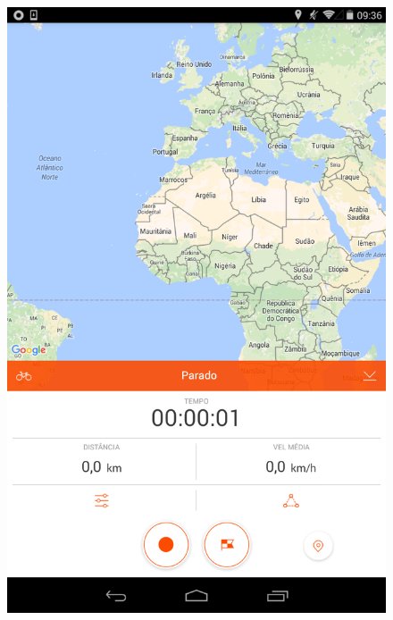 \begin{figure}[h]
\centering
\begin{minipage}{.5\textwidth}
  \centering
  \includegraphics[width=.8\linewidth]{figuras/strava.png}
  \label{fig:strava}
  \newline
\end{minipage}%
\begin{minipage}{.5\textwidth}
  \centering

\end{minipage}
\end{figure}
